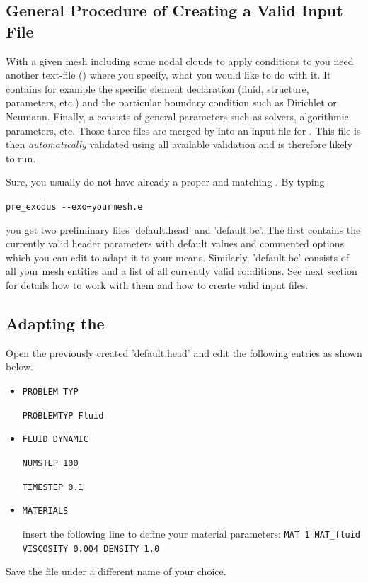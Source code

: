 \subsection{General Procedure of Creating a Valid \baci{} Input File}
With a given mesh including some nodal clouds to apply conditions to you need
another text-file (\bc) where you specify, what you would like to do with
it. It contains for example the specific element declaration (fluid, structure,
parameters, etc.) and the particular boundary condition such as Dirichlet or
Neumann. Finally, a \head consists of general parameters such as
solvers, algorithmic parameters, etc. Those three files are merged by \prexo
into an input file for \baci{}. This file is then \emph{automatically} validated
using all available \baci{} validation and is therefore likely to run.

Sure, you usually do not have already a proper \head and matching \bc. By
typing
\begin{center}
  \verb|pre_exodus --exo=yourmesh.e|
\end{center}
you get two preliminary files
'default.head' and 'default.bc'. The first contains the currently valid header
parameters with default values and commented options which you can edit to
adapt it to your means. Similarly, 'default.bc' consists of all your mesh
entities and a list of all currently valid conditions. See next section for
details how to work with them and how to create valid input files.


\subsection{Adapting the \head}
Open the previously created \head 'default.head' and edit the following entries as shown below.
\begin{itemize}
 \item \verb|PROBLEM TYP|

 \verb|PROBLEMTYP Fluid|
 \item \verb|FLUID DYNAMIC|

 \verb|NUMSTEP 100|

 \verb|TIMESTEP 0.1|

 \item \verb|MATERIALS|

 insert the following line to define your material parameters: \newline
 \verb|MAT 1 MAT_fluid VISCOSITY 0.004 DENSITY 1.0|
 
\end{itemize}
Save the file under a different name of your choice.

